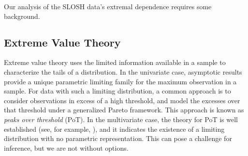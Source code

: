 Our analysis of the SLOSH data's extremal dependence requires some background.

\subsection{Extreme Value Theory\label{ref:evt}}

Extreme value theory uses the limited information available in a sample to
    characterize the tails of a distribution.  In the univariate case, asymptotic
    results provide a unique parametric limiting family for the maximum observation
    in a sample.  For data with such a limiting distribution, a common approach
    is to consider observations in excess of a high threshold, and model the
    excesses over that threshold under a generalized Pareto framework.  This
    approach is known as \emph{peaks over threshold} (PoT).  In the multivariate 
    case, the theory for PoT is well established (see, for example, 
    \cite{dehaan2006}), and it indicates the existence of a limiting distribution
    with no parametric representation.  This can pose a challenge for inference,
    but we are not without options.


